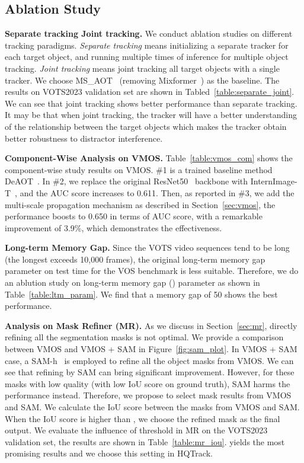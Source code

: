\documentclass[10pt,twocolumn,letterpaper]{article}
\begin{document}
\subsection{Ablation Study}

\noindent\textbf{Separate tracking  Joint tracking.}
We conduct ablation studies on different tracking paradigms. 
\textit{Separate tracking} means initializing a separate tracker for each target object, and running multiple times of inference for multiple object tracking.
\textit{Joint tracking} means joint tracking all target objects with a single tracker.
We choose MS\_AOT~\cite{vot22} (removing Mixformer~\cite{mixformer}) as the baseline.
The results on VOTS2023 validation set are shown in Tabled~\ref{table:separate_joint}.
We can see that joint tracking shows better performance than separate tracking.
It may be that when joint tracking, the tracker will have a better understanding of the relationship between the target objects which makes the tracker obtain better robustness to distractor interference.

\noindent\textbf{Component-Wise Analysis on VMOS.}
Table~\ref{table:vmos_com} shows the component-wise study results on VMOS.
\#1 is a trained baseline method DeAOT~\cite{deaot}.
In \#2, we replace the original ResNet50~\cite{resnet} backbone with InternImage-T~\cite{internimage}, and the AUC score increases to 0.611.
Then, as reported in \#3, we add the multi-scale propagation mechanism as described in Section~\ref{sec:vmos}, the performance boosts to 0.650 in terms of AUC score, with a remarkable improvement of 3.9\%, which demonstrates the effectiveness.

\noindent\textbf{Long-term Memory Gap.}
Since the VOTS video sequences tend to be long (the longest exceeds 10,000 frames), the original long-term memory gap parameter on test time for the VOS benchmark is less suitable. 
Therefore, we do an ablution study on long-term memory gap () parameter as shown in Table~\ref{table:ltm_param}. 
We find that a memory gap of 50 shows the best performance.

\noindent\textbf{Analysis on Mask Refiner (MR).}
As we discuss in Section~\ref{sec:mr}, directly refining all the segmentation masks is not optimal. We provide a comparison between VMOS and VMOS + SAM in Figure~\ref{fig:sam_plot}. In VMOS + SAM case, a SAM-h~\cite{sam} is employed to refine all the object masks from VMOS. 
We can see that refining by SAM can bring significant improvement. However, for these masks with low quality (with low IoU score on ground truth), SAM harms the performance instead.
Therefore, we propose to select mask results from VMOS and SAM. We calculate the IoU score between the masks from VMOS and SAM. When the IoU score is higher than , we choose the refined mask as the final output. 
We evaluate the influence of threshold  in MR on the VOTS2023 validation set, the results are shown in Table~\ref{table:mr_iou}.
 yields the most promising results and we choose this setting in HQTrack.
\end{document}
